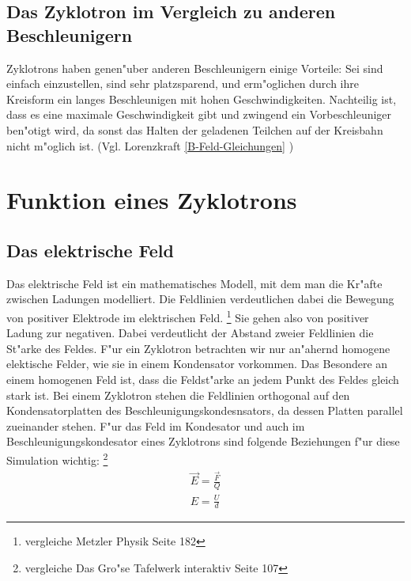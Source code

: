 \documentclass[14pt, a4paper]{report}
\begin{document}
\section{Das Zyklotron im Vergleich zu anderen Beschleunigern}
Zyklotrons haben genen"uber anderen Beschleunigern einige Vorteile: Sei sind einfach
einzustellen, sind sehr  platzsparend, und erm"oglichen durch ihre Kreisform  ein langes
Beschleunigen mit hohen Geschwindigkeiten. Nachteilig ist, dass es eine maximale
Geschwindigkeit gibt und zwingend ein Vorbeschleuniger ben"otigt wird, da sonst das 
Halten der geladenen Teilchen auf der Kreisbahn nicht m"oglich ist. (Vgl. Lorenzkraft
\ref {B-Feld-Gleichungen} )

\chapter{Funktion eines Zyklotrons}
\section{Das elektrische Feld}
Das elektrische Feld ist ein mathematisches Modell, mit dem man die Kr"afte zwischen
Ladungen modelliert. Die Feldlinien verdeutlichen dabei die Bewegung von positiver 
Elektrode im elektrischen Feld. \footnote{vergleiche Metzler Physik Seite 182}
Sie gehen also von positiver Ladung zur negativen. Dabei verdeutlicht der Abstand zweier
Feldlinien die St"arke des Feldes. F"ur ein Zyklotron betrachten wir nur an"ahernd
homogene elektische Felder, wie sie in einem Kondensator vorkommen. Das Besondere an 
einem homogenen Feld ist, dass die Feldst"arke an jedem Punkt des Feldes gleich stark 
ist. Bei einem Zyklotron stehen die Feldlinien orthogonal auf den Kondensatorplatten
des Beschleunigungskondesnsators, da dessen Platten parallel zueinander stehen.
F"ur das Feld im Kondesator und auch im Beschleunigungskondesator eines Zyklotrons
sind folgende Beziehungen f"ur diese Simulation wichtig:
\footnote{vergleiche Das Gro"se Tafelwerk interaktiv Seite 107}
\begin{eqnarray} \label{E-Feld-Gleichungen}
\vec{E} = \frac{\vec{F}}{Q} \\
E = \frac{U}{d}
\end{eqnarray}
\end{document}
